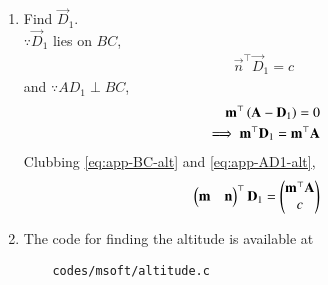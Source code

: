 \begin{enumerate}[label=\thesubsection.\arabic*.,ref=\thesubsection.\theenumi]
  \item Find $\vec{D}_1$.
	  \\
		\solution $\because \vec{D}_1$ lies on $BC$, 
\begin{align}
			\label{eq:app-BC-alt}
\vec{n}^\top\vec{D}_1 =c
\end{align}
and 
	$\because AD_1 \perp BC$,
\begin{align}
	\mathbf{m}^{\top}\left(\mathbf{A}-\mathbf{D}_1\right) = 0
	\\
	\implies 
	\mathbf{m}^{\top}\mathbf{D}_1 = 
	\mathbf{m}^{\top}\mathbf{A}
			\label{eq:app-AD1-alt}
\end{align}
Clubbing
			\eqref{eq:app-BC-alt}
			and 
			\eqref{eq:app-AD1-alt},
\begin{align}
			\label{eq:app-D1-alt}
	\begin{pmatrix}\mathbf{m} & \mathbf{n}\end{pmatrix}^\top\mathbf{D}_1 &= 
	   \begin{pmatrix}
              \mathbf{m}^\top\mathbf{A}\\
	      c
	      \end{pmatrix}
\end{align}
\item 
The code for finding the altitude is available at
\begin{lstlisting}
	codes/msoft/altitude.c
\end{lstlisting}
\end{enumerate}
